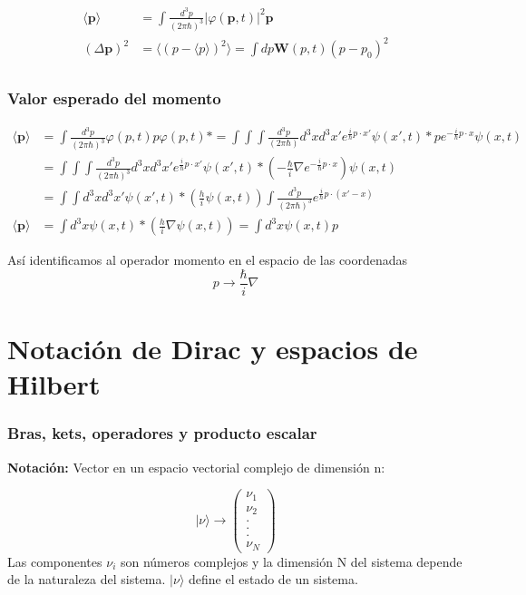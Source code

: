 \documentclass{report}
\begin{document}
\begin{align*}
    \langle \textbf{p} \rangle &= \int \frac{d^3p}{(2\pi\hbar)^3} \left\vert \varphi(\textbf{p},t) \right\vert^2 \textbf{p} \\
    (\Delta\textbf{p})^2 &=\langle(p-\langle p\rangle)^2\rangle=\int dp \mathbf{W}(p,t)(p-p_0)^2\\
\end{align*}

\subsubsection{Valor esperado del momento}
\begin{align*}
    \langle \textbf{p} \rangle &= \int \frac{d^3 p}{(2\pi\hbar)^3} \varphi(p,t)p\varphi(p,t)*= \int\int\int \frac{d^3p}{(2\pi\hbar)}d^3xd^3x'e^{\frac{i}{\hbar}p\cdot x'}\psi(x',t)*pe^{-\frac{i}{\hbar}p\cdot x}\psi(x,t)\\
    &=\int\int\int \frac{d^3p}{(2\pi\hbar)^3}d^3x d^3x'e^{\frac{i}{\hbar}p\cdot x'}\psi(x',t)*(-\frac{\hbar}{i}\nabla e^{-\frac{i}{\hbar}p\cdot x})\psi(x,t)\\
    &=\int\int d^3xd^3x'\psi(x',t)*(\frac{h}{i}\psi(x,t))\int \frac{d^3p}{(2\pi\hbar)^3}e^{\frac{i}{\hbar}p\cdot(x'-x)}\\
    \langle \textbf{p} \rangle &=\int d^3x \psi(x,t)*(\frac{h}{i}\nabla\psi(x,t))=\int d^3x\psi(x,t) p
\end{align*}

Así identificamos al operador momento en el espacio de las coordenadas
\begin{equation}
    p\rightarrow \frac{\hbar}{i}\nabla
\end{equation}

\section{Notación de Dirac y espacios de Hilbert}
\subsubsection{Bras, kets, operadores y producto escalar}
\textbf{Notación:} Vector en un espacio vectorial complejo de dimensión n:
\begin{multicols}{2}
    \begin{equation*}
        \vert \nu \rangle \rightarrow \begin{pmatrix}
            \nu_1\\ \nu_2\\ .\\.\\.\\\nu_N
        \end{pmatrix}
    \end{equation*}
    Las componentes $\nu_i$ son números complejos y la dimensión N del sistema depende de la naturaleza del sistema. $\vert \nu \rangle $ define el estado de un sistema.
\end{multicols}
\end{document}
